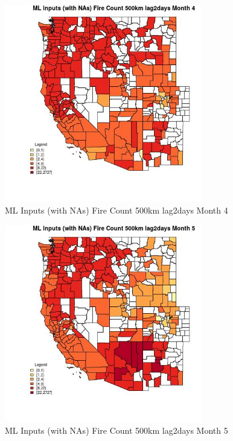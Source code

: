 \begin{figure} 
\centering  
\includegraphics[width=0.77\textwidth]{Code_Outputs/Report_ML_input_PM25_Step4_part_f_de_duplicated_aveswNAs_CountyFire_Count_500km_lag2daysmedianMonth4.jpg} 
\caption{\label{fig:Report_ML_input_PM25_Step4_part_f_de_duplicated_aveswNAsCountyFire_Count_500km_lag2daysmedianMonth4}ML Inputs (with NAs) Fire Count 500km lag2days Month 4} 
\end{figure} 
 

\begin{figure} 
\centering  
\includegraphics[width=0.77\textwidth]{Code_Outputs/Report_ML_input_PM25_Step4_part_f_de_duplicated_aveswNAs_CountyFire_Count_500km_lag2daysmedianMonth5.jpg} 
\caption{\label{fig:Report_ML_input_PM25_Step4_part_f_de_duplicated_aveswNAsCountyFire_Count_500km_lag2daysmedianMonth5}ML Inputs (with NAs) Fire Count 500km lag2days Month 5} 
\end{figure} 
 

